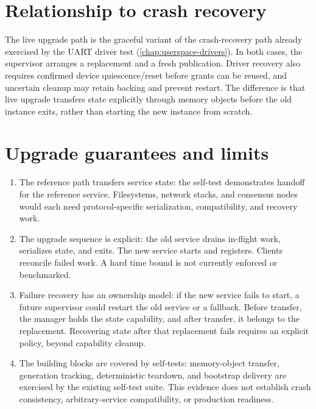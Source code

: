 \section{Relationship to crash recovery}

The live upgrade path is the graceful variant of the crash-recovery path
already exercised by the UART driver test (\autoref{chap:userspace-drivers}). In both cases, the
supervisor arranges a replacement and a fresh publication. Driver recovery also
requires confirmed device quiescence/reset before grants can be reused, and
uncertain cleanup may retain backing and prevent restart. The difference is that live
upgrade transfers state explicitly through memory objects before the old
instance exits, rather than starting the new instance from scratch.

\section{Upgrade guarantees and limits}

\begin{enumerate}
    \item The reference path transfers service state: the self-test
        demonstrates handoff for the reference service. Filesystems, network
        stacks, and consensus nodes would each need protocol-specific
        serialization, compatibility, and recovery work.

    \item The upgrade sequence is explicit: the old service drains
        in-flight work, serializes state, and exits. The new service starts
        and registers. Clients reconcile failed work. A hard time bound is not currently
        enforced or benchmarked.

    \item Failure recovery has an ownership model: if the new service
        fails to start, a future supervisor could restart the old service or a
        fallback.
        Before transfer, the manager holds the state capability, and after
        transfer, it belongs to the replacement. Recovering state after that
        replacement fails requires an explicit policy, beyond capability
        cleanup.

    \item The building blocks are covered by self-tests: memory-object
        transfer, generation tracking, deterministic teardown, and bootstrap
        delivery are exercised by the existing self-test suite. This evidence
        does not establish crash consistency, arbitrary-service compatibility,
        or production readiness.
\end{enumerate}

\endinput
